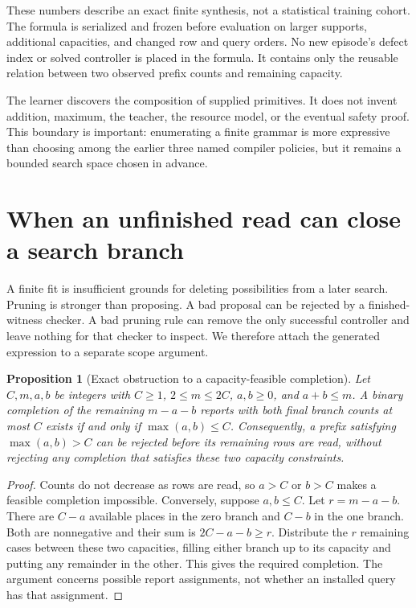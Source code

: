 \documentclass[11pt,letterpaper]{article}
\theoremstyle{plain}
\newtheorem{proposition}[theorem]{Proposition}
\theoremstyle{definition}
\begin{document}
These numbers describe an exact finite synthesis, not a statistical training cohort. The formula is serialized and frozen before evaluation on larger supports, additional capacities, and changed row and query orders. No new episode's defect index or solved controller is placed in the formula. It contains only the reusable relation between two observed prefix counts and remaining capacity.

The learner discovers the composition of supplied primitives. It does not invent addition, maximum, the teacher, the resource model, or the eventual safety proof. This boundary is important: enumerating a finite grammar is more expressive than choosing among the earlier three named compiler policies, but it remains a bounded search space chosen in advance.

\section{When an unfinished read can close a search branch}\label{sec:prefix-pruning}
A finite fit is insufficient grounds for deleting possibilities from a later search. Pruning is stronger than proposing. A bad proposal can be rejected by a finished-witness checker. A bad pruning rule can remove the only successful controller and leave nothing for that checker to inspect. We therefore attach the generated expression to a separate scope argument.

\begin{proposition}[Exact obstruction to a capacity-feasible completion]\label{prop:prefix-capacity}
Let $C,m,a,b$ be integers with $C\geq1$, $2\leq m\leq2C$, $a,b\geq0$, and $a+b\leq m$. A binary completion of the remaining $m-a-b$ reports with both final branch counts at most $C$ exists if and only if $\max(a,b)\leq C$. Consequently, a prefix satisfying $\max(a,b)>C$ can be rejected before its remaining rows are read, without rejecting any completion that satisfies these two capacity constraints.
\end{proposition}
\begin{proof}
Counts do not decrease as rows are read, so $a>C$ or $b>C$ makes a feasible completion impossible. Conversely, suppose $a,b\leq C$. Let $r=m-a-b$. There are $C-a$ available places in the zero branch and $C-b$ in the one branch. Both are nonnegative and their sum is $2C-a-b\geq r$. Distribute the $r$ remaining cases between these two capacities, filling either branch up to its capacity and putting any remainder in the other. This gives the required completion. The argument concerns possible report assignments, not whether an installed query has that assignment.
\end{proof}
\end{document}
